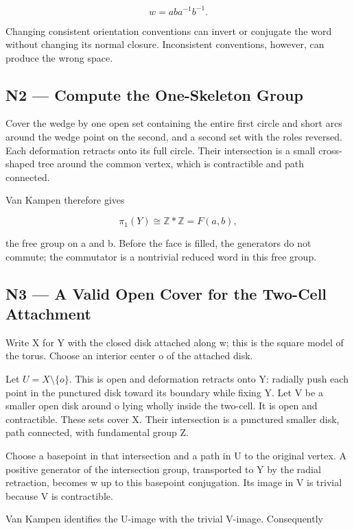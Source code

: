\documentclass[preprint,12pt,aps,pra,showkeys,amsmath,amssymb,superscriptaddress,floatfix]{revtex4-2}
\theoremstyle{definition}
\theoremstyle{remark}
\begin{document}
\[w=aba^{-1}b^{-1}.\]

Changing consistent orientation conventions can invert or conjugate the
word without changing its normal closure. Inconsistent conventions,
however, can produce the wrong space.

\subsection{N2 --- Compute the One-Skeleton
Group}\label{n2-compute-the-one-skeleton-group}

Cover the wedge by one open set containing the entire first circle and
short arcs around the wedge point on the second, and a second set with
the roles reversed. Each deformation retracts onto its full circle.
Their intersection is a small cross-shaped tree around the common
vertex, which is contractible and path connected.

Van Kampen therefore gives

\[\pi_1(Y)\cong\mathbb Z*\mathbb Z=F(a,b),\]

the free group on a and b. Before the face is filled, the generators do
not commute; the commutator is a nontrivial reduced word in this free
group.

\subsection{N3 --- A Valid Open Cover for the Two-Cell
Attachment}\label{n3-a-valid-open-cover-for-the-two-cell-attachment}

Write X for Y with the closed disk attached along w; this is the square
model of the torus. Choose an interior center o of the attached disk.

Let \(U=X\setminus\{o\}\). This is open and deformation retracts onto Y:
radially push each point in the punctured disk toward its boundary while
fixing Y. Let V be a smaller open disk around o lying wholly inside the
two-cell. It is open and contractible. These sets cover X. Their
intersection is a punctured smaller disk, path connected, with
fundamental group Z.

Choose a basepoint in that intersection and a path in U to the original
vertex. A positive generator of the intersection group, transported to Y
by the radial retraction, becomes w up to this basepoint conjugation.
Its image in V is trivial because V is contractible.

Van Kampen identifies the U-image with the trivial V-image. Consequently
\end{document}
